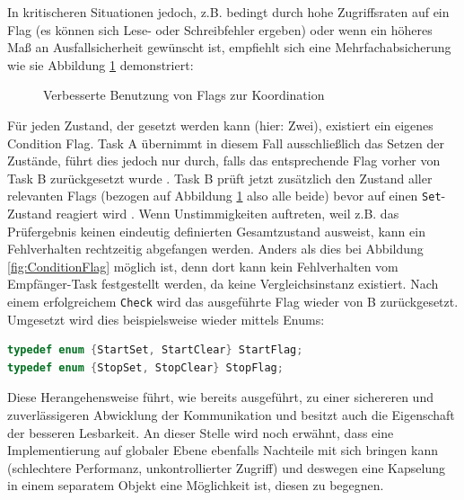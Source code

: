 \documentclass{llncs}
\begin{document}
In kritischeren Situationen jedoch, z.B. bedingt durch hohe Zugriffsraten auf ein Flag (es können sich Lese- oder Schreibfehler ergeben) oder wenn ein höheres Maß an Ausfallsicherheit gewünscht ist, empfiehlt sich eine Mehrfachabsicherung wie sie Abbildung \ref{fig:ConditionFlag2} demonstriert:

\begin{figure} [h]
	\centering
	\def\svgwidth{300pt}
	
	\caption{\label{fig:ConditionFlag2} Verbesserte Benutzung von Flags zur Koordination \autocite[vgl.][84]{Cooling2017}}
\end{figure}

Für jeden Zustand, der gesetzt werden kann (hier: Zwei), existiert ein eigenes Condition Flag. Task A übernimmt in diesem Fall ausschließlich das Setzen der Zustände, führt dies jedoch nur durch, falls das entsprechende Flag vorher von Task B zurückgesetzt wurde \autocite[vgl.][85]{Cooling2017}. Task B prüft jetzt zusätzlich den Zustand aller relevanten Flags (bezogen auf Abbildung \ref{fig:ConditionFlag2} also alle beide) bevor auf einen \texttt{Set}-Zustand reagiert wird \autocite[vgl.][85]{Cooling2017}. Wenn Unstimmigkeiten auftreten, weil z.B. das Prüfergebnis keinen eindeutig definierten Gesamtzustand ausweist, kann ein Fehlverhalten rechtzeitig abgefangen werden. Anders als dies bei Abbildung \ref{fig:ConditionFlag} möglich ist, denn dort kann kein Fehlverhalten vom Empfänger-Task festgestellt werden, da keine Vergleichsinstanz existiert. Nach einem erfolgreichem \texttt{Check} wird das ausgeführte Flag wieder von B zurückgesetzt. Umgesetzt wird dies beispielsweise wieder mittels Enums:
\begin{lstlisting}[language=C]
typedef enum {StartSet, StartClear} StartFlag;
typedef enum {StopSet, StopClear} StopFlag;
\end{lstlisting}
Diese Herangehensweise führt, wie bereits ausgeführt, zu einer sichereren und zuverlässigeren Abwicklung der Kommunikation und besitzt auch die Eigenschaft der besseren Lesbarkeit. An dieser Stelle wird noch erwähnt, dass eine Implementierung auf globaler Ebene ebenfalls Nachteile mit sich bringen kann (schlechtere Performanz, unkontrollierter Zugriff) und deswegen eine Kapselung in einem separatem Objekt eine Möglichkeit ist, diesen zu begegnen.\\
\end{document}
